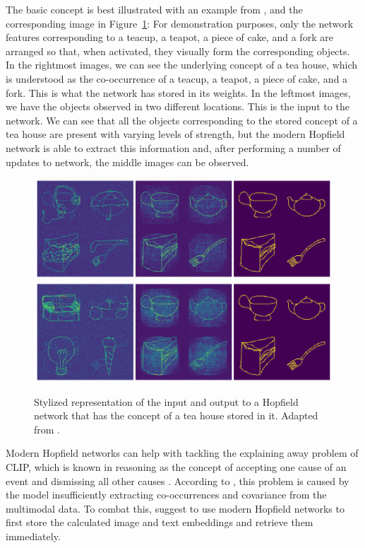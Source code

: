 \documentclass{scrarticle}
\begin{document}
The basic concept is best illustrated with an example from \citet{blogpost_cloob}, and the corresponding image in Figure~\ref{fig:tea_house}: For demonstration purposes, only the network features corresponding to a teacup, a teapot, a piece of cake, and a fork are arranged so that, when activated, they visually form the corresponding objects. In the rightmost images, we can see the underlying concept of a tea house, which is understood as the co-occurrence of a teacup, a teapot, a piece of cake, and a fork. This is what the network has stored in its weights. In the leftmost images, we have the objects observed in two different locations. This is the input to the network. We can see that all the objects corresponding to the stored concept of a tea house are present with varying levels of strength, but the modern Hopfield network is able to extract this information and, after performing a number of updates to network, the middle images can be observed.

\begin{figure}[H]
  \begin{center}
    \includegraphics[width=\textwidth]{sketch_tea_hopfield}
    \includegraphics[width=\textwidth]{sketch_tea2_hopfield}
  \end{center}
  \caption{Stylized representation of the input and output to a Hopfield network that has the concept of a tea house stored in it. Adapted from \citet{blogpost_cloob}.}
  \label{fig:tea_house}
\end{figure}

Modern Hopfield networks can help with tackling the explaining away problem of CLIP, which is known in reasoning as the concept of accepting one cause of an event and dismissing all other causes \cite{explaining_away}. According to \citet{cloob}, this problem is caused by the model insufficiently extracting co-occurrences and covariance from the multimodal data. To combat this, \citet{cloob} suggest to use modern Hopfield networks to first store the calculated image and text embeddings and retrieve them immediately.
\end{document}
